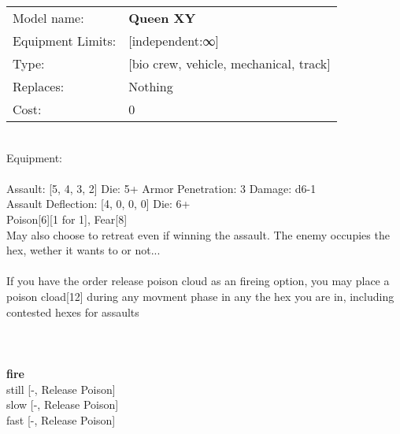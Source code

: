 \noindent
\begin{tabular}{ll}
Model name: &{\bf Queen XY } \\
Equipment Limits: &[independent:∞] \\
Type: &[bio crew, vehicle, mechanical, track] \\
Replaces: &Nothing \\
Cost: & 0\\
\end{tabular}
\ \\
Equipment:  \\
\ \\
Assault: [5, 4, 3, 2] Die: 5+ Armor Penetration: 3 Damage: d6-1 \\
Assault Deflection: [4, 0, 0, 0] Die: 6+\\
\indent Poison[6][1 for 1], Fear[8]\\ 
May also choose to retreat even if winning the assault. The enemy occupies the hex, wether it wants to or not...\\ 
 
\ \\
If you have the order release poison cloud as an fireing option, you may place a poison cload[12] during any movment phase in any the hex you are in, including contested hexes for assaults\\ 

\ \\
 
\ \\



\ \\ {\bf fire } \\
still [-, Release Poison] \\
slow [-, Release Poison] \\
fast [-, Release Poison] \\


